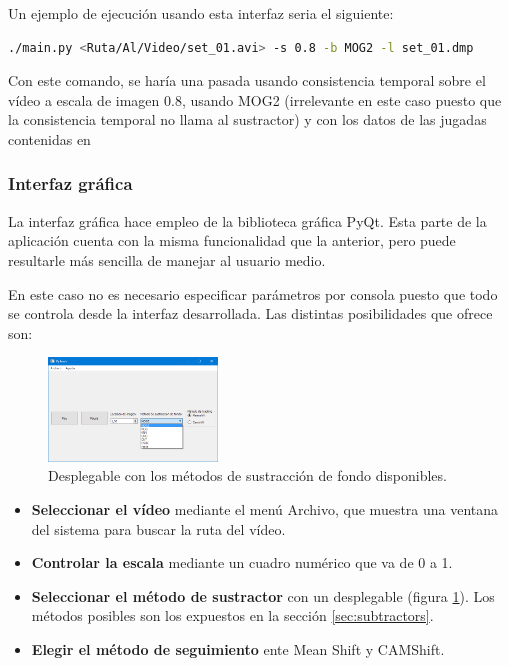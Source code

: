Un ejemplo de ejecución usando esta interfaz seria el siguiente:
\begin{lstlisting}[language=bash]
  ./main.py <Ruta/Al/Video/set_01.avi> -s 0.8 -b MOG2 -l set_01.dmp
\end{lstlisting}

Con este comando, se haría una pasada usando consistencia temporal sobre el vídeo  a escala de imagen $0.8$, usando MOG2 (irrelevante en este caso puesto que la consistencia temporal no llama al sustractor) y con los datos de las jugadas contenidas en 


\subsubsection*{Interfaz gráfica}
La interfaz gráfica hace empleo de la biblioteca gráfica PyQt. Esta parte de la aplicación cuenta con la misma funcionalidad que la anterior, pero puede resultarle más sencilla de manejar al usuario medio.

En este caso no es necesario especificar parámetros por consola puesto que todo se controla desde la interfaz desarrollada. Las distintas posibilidades que ofrece son:

\begin{figure}
    \centering
    \includegraphics[width=0.4\textwidth]{images/combobox}
    \caption{Desplegable con los métodos de sustracción de fondo disponibles.}
    \label{fig:combobox}
\end{figure}

\begin{itemize}
  \item \textbf{Seleccionar el vídeo} mediante el menú Archivo, que muestra una ventana del sistema para buscar la ruta del vídeo.
  \item \textbf{Controlar la escala} mediante un cuadro numérico que va de 0 a 1.
  \item \textbf{Seleccionar el método de sustractor} con un desplegable (figura \ref{fig:combobox}). Los métodos posibles son los expuestos en la sección \ref{sec:subtractors}.
  \item \textbf{Elegir el método de seguimiento} ente Mean Shift y CAMShift.
\end{itemize}

